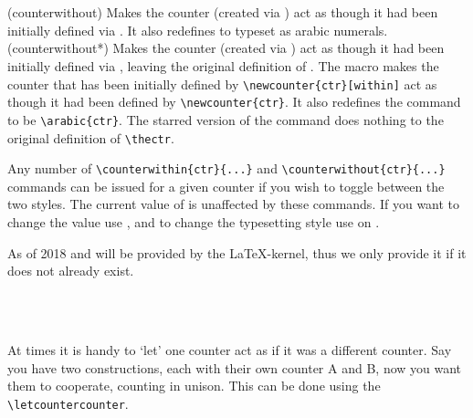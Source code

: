 \begin{syntax}
\cmd{\counterwithout} \\
\cmd{\counterwithout*} \\
\end{syntax}
\glossary(counterwithout)%
  {}%
  {Makes the counter  (created via 
   ) act as though 
   it had been initially defined via .
   It also redefines  to typeset as arabic numerals.}
\glossary(counterwithout*)%
  {}%
  {Makes the counter  (created via 
   ) act as though 
   it had been initially defined via ,
   leaving the original definition of .}
The \cmd{\counterwithout} macro makes the  counter that has been 
initially
defined by \verb?\newcounter{ctr}[within]? act as though it had been defined by
\verb?\newcounter{ctr}?. It also redefines the  command
to be \verb?\arabic{ctr}?. The starred version of the command
does nothing to the original definition of \verb?\thectr?.

    Any number of \verb?\counterwithin{ctr}{...}? and \verb?\counterwithout{ctr}{...}?
commands can be issued for a given counter  if you wish to toggle
between the two styles. The current value of  is unaffected by these
commands. If you want to change the value use \cmd{\setcounter}, and to change
the typesetting style use \cmd{\renewcommand} on .


\begin{caveat}
  As of 2018 \cmd{\counterwithout} and \cmd{\counterwithin} will be
  provided by the \LaTeX-kernel, thus we only provide it if it does
  not already exist.
\end{caveat}





\begin{syntax}
  \\
  \cmd{\unletcounter}\\
\end{syntax}
At times it is handy to `let' one counter act as if it was a
different counter. Say you have two constructions, each with their
own counter A and B, now you want them to cooperate, counting in
unison. This can be done using the \verb?\letcountercounter?.

